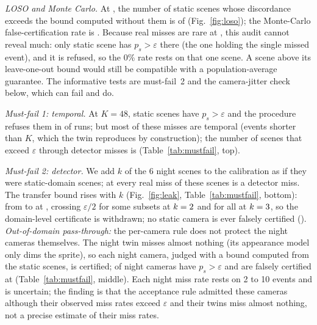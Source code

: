 \emph{LOSO and Monte Carlo.} At \OPs, the number of static scenes whose discordance exceeds the bound computed
without them is \nLosoOP{} of \nMainScenes{} (Fig.~\ref{fig:loso}); the Monte-Carlo
false-certification rate is \nMcFC. Because real misses are rare at \OPs, this audit cannot reveal much: only
\nScenesPgtEpsOP{} static scene has $p_s>\varepsilon$ there (the one holding the single missed event), and it is refused, so
the 0\% rate rests on that one scene.
A scene above its leave-one-out bound would still be compatible with a population-average guarantee. The informative
tests are must-fail~2 and the camera-jitter check below, which can fail and do.

\emph{Must-fail 1: temporal.} At $K=48$, \nMustFailScenes{} static scenes have $p_s>\varepsilon$ and the procedure refuses
them in \nMustFailRefuse{} of runs; but most of these misses are temporal (events shorter than $K$, which the twin
reproduces by construction); the number of scenes that exceed $\varepsilon$ through detector misses is \nMustFailApp
(Table~\ref{tab:mustfail}, top).

\emph{Must-fail 2: detector.} We add $k$ of the 6 night scenes to the calibration as if they were static-domain scenes;
at \OPs{} every real miss of these scenes is a detector miss. The transfer bound rises with $k$
(Fig.~\ref{fig:leak}, Table~\ref{tab:mustfail}, bottom): from \nLeakUpopZero{} to \nLeakUpopSix{} at \OPs{}, crossing
$\varepsilon/2$ for some subsets at $k=2$ and for all at $k=3$, so the domain-level
certificate is withdrawn; no static camera is ever falsely certified (\nMainFCleak). \emph{Out-of-domain pass-through:}
the per-camera rule does not protect the night cameras themselves. The night twin misses almost nothing (its appearance
model only dims the sprite), so each night camera, judged with a bound computed from the static scenes, is certified;
\nNightFC{} of \nNightScenes{} night cameras have $p_s>\varepsilon$ and are falsely certified at \OPs{}
(Table~\ref{tab:mustfail}, middle). Each night miss rate rests on 2 to 10 events and is uncertain; the
finding is that the acceptance rule admitted these cameras although their observed miss rates exceed $\varepsilon$ and
their twins miss almost nothing, not a precise estimate of their miss rates.


